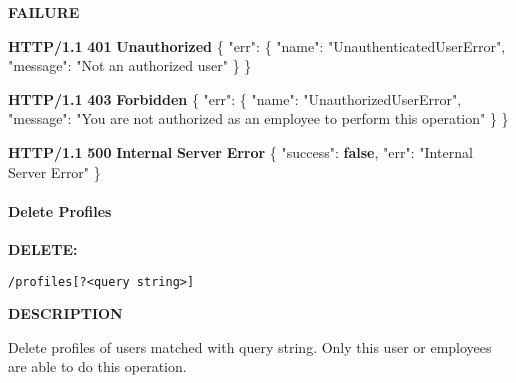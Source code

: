 \documentclass[
]{article}
\newenvironment{Shaded}{}{}
\newcommand{\DataTypeTok}[1]{\textcolor[rgb]{0.56,0.13,0.00}{#1}}
\newcommand{\ErrorTok}[1]{\textcolor[rgb]{1.00,0.00,0.00}{\textbf{#1}}}
\newcommand{\FunctionTok}[1]{\textcolor[rgb]{0.02,0.16,0.49}{#1}}
\newcommand{\KeywordTok}[1]{\textcolor[rgb]{0.00,0.44,0.13}{\textbf{#1}}}
\newcommand{\StringTok}[1]{\textcolor[rgb]{0.25,0.44,0.63}{#1}}
\begin{document}
\textbf{FAILURE}

\begin{Shaded}
\begin{Highlighting}[]
\ErrorTok{HTTP/1.1} \ErrorTok{401} \ErrorTok{Unauthorized}
\FunctionTok{\{}
    \DataTypeTok{"err"}\FunctionTok{:} \FunctionTok{\{}
        \DataTypeTok{"name"}\FunctionTok{:} \StringTok{"UnauthenticatedUserError"}\FunctionTok{,}
        \DataTypeTok{"message"}\FunctionTok{:} \StringTok{"Not an authorized user"}
    \FunctionTok{\}}
\FunctionTok{\}}
\end{Highlighting}
\end{Shaded}

\begin{Shaded}
\begin{Highlighting}[]
\ErrorTok{HTTP/1.1} \ErrorTok{403} \ErrorTok{Forbidden}
\FunctionTok{\{}
    \DataTypeTok{"err"}\FunctionTok{:} \FunctionTok{\{}
        \DataTypeTok{"name"}\FunctionTok{:} \StringTok{"UnauthorizedUserError"}\FunctionTok{,}
        \DataTypeTok{"message"}\FunctionTok{:} \StringTok{"You are not authorized as an employee to perform this operation"}
    \FunctionTok{\}}
\FunctionTok{\}}
\end{Highlighting}
\end{Shaded}

\begin{Shaded}
\begin{Highlighting}[]
\ErrorTok{HTTP/1.1} \ErrorTok{500} \ErrorTok{Internal} \ErrorTok{Server} \ErrorTok{Error}
\FunctionTok{\{}
    \DataTypeTok{"success"}\FunctionTok{:} \KeywordTok{false}\FunctionTok{,}
    \DataTypeTok{"err"}\FunctionTok{:} \StringTok{"Internal Server Error"}
\FunctionTok{\}}
\end{Highlighting}
\end{Shaded}

\hypertarget{header-n362}{%
\paragraph{Delete Profiles}\label{header-n362}}

\textbf{DELETE:}

\begin{verbatim}
/profiles[?<query string>]
\end{verbatim}

\textbf{DESCRIPTION}

Delete profiles of users matched with query string. Only this user or
employees are able to do this operation.
\end{document}
